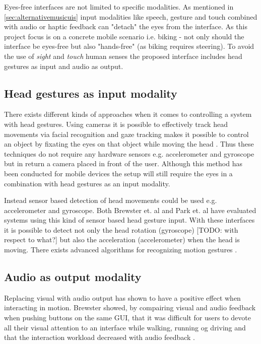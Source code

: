 Eyes-free interfaces are not limited to specific modalities. As mentioned in \ref{sec:alternativemusicuis} input modalities like speech, gesture and touch combined with audio or haptic feedback can "detach" the eyes from the interface. As this project focus is on a concrete mobile scenario i.e. biking - not only should the interface be eyes-free but also "hands-free" (as biking requires steering). To avoid the use of \textit{sight} and \textit{touch} human senses the proposed interface includes head gestures as input and audio as output.

\subsection{Head gestures as input modality}

There exists different kinds of approaches when it comes to controlling a system with head gestures. Using cameras it is possible to effectively track head movements via facial recognition \cite{morimoto_recognition_1996} and gaze tracking makes it possible to control an object by fixating the eyes on that object while moving the head \cite{vspakov_enhanced_2012}. Thus these techniques do not require any hardware sensors e.g. accelerometer and gyroscope but in return a camera placed in front of the user. Although this method has been conducted for mobile devices \cite{mardanbegi_eye-based_2012} the setup will still require the eyes in a combination with head gestures as an input modality.

Instead sensor based detection of head movements could be used e.g. accelerometer and gyroscope. Both Brewster et. al \cite{brewster_multimodaleyes-freeinteraction_2003} and Park et. al \cite{park_gaze-directed_2011} have evaluated systems using this kind of sensor based head gesture input. With these interfaces it is possible to detect not only the head rotation (gyroscope) [TODO: with respect to what?] but also the acceleration (accelerometer) when the head is moving. There exists advanced algorithms for recognizing motion gestures \cite{lu_head_2005, kratz_combining_2013, akl_accelerometer-based_2010}.

\subsection{Audio as output modality}
\label{sec:audiomodality}
Replacing visual with audio output has shown to have a positive effect when interacting in motion. Brewster showed, by compairing visual and audio feedback when pushing buttons on the same GUI, that it was difficult for users to devote all their visual attention to an interface while walking, running og driving and that the interaction workload decreased with audio feedback \cite{brewster_overcoming_2002}.

